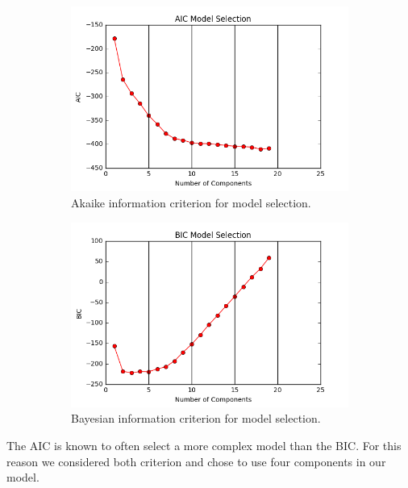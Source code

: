 \documentclass{article}
\begin{document}
\begin{figure}[H]
\begin{subfigure}[t]{0.45\textwidth}
\centering
\includegraphics[width=.99\textwidth]{../figs/aic_model.png}
\caption{Akaike information criterion for model selection.}
\label{fig:subim1}
\end{subfigure}\hfill
\begin{subfigure}[t]{0.45\textwidth}
\centering
\includegraphics[width=.99\textwidth]{../figs/bic_model.png}
\caption{Bayesian information criterion for model selection.}
\label{fig:subim2}
\end{subfigure}
\caption{}
\label{fig:image2}
\end{figure}
\noindent
The AIC is known to often select a more complex model than the BIC. For this reason we considered both criterion and chose to use four components in our model.
\newline
\indent
\end{document}

